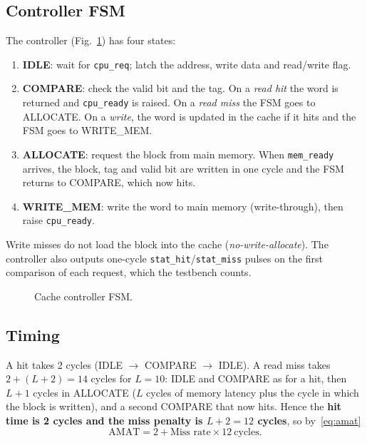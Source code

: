\documentclass[conference]{IEEEtran}
\begin{document}
\subsection{Controller FSM}
The controller (Fig.~\ref{fig:fsm}) has four states:
\begin{enumerate}
\item \textbf{IDLE}: wait for \texttt{cpu\_req}; latch the address, write data and read/write flag.
\item \textbf{COMPARE}: check the valid bit and the tag. On a \emph{read hit} the word is returned and
\texttt{cpu\_ready} is raised. On a \emph{read miss} the FSM goes to ALLOCATE. On a \emph{write}, the word is
updated in the cache if it hits and the FSM goes to WRITE\_MEM.
\item \textbf{ALLOCATE}: request the block from main memory. When \texttt{mem\_ready} arrives, the block, tag and
valid bit are written in one cycle and the FSM returns to COMPARE, which now hits.
\item \textbf{WRITE\_MEM}: write the word to main memory (write-through), then raise \texttt{cpu\_ready}.
\end{enumerate}
Write misses do not load the block into the cache (\emph{no-write-allocate}). The controller also outputs one-cycle
\texttt{stat\_hit}/\texttt{stat\_miss} pulses on the first comparison of each request, which the testbench counts.

\begin{figure}[t]
\centering
\resizebox{0.95\columnwidth}{!}{}
\caption{Cache controller FSM.}
\label{fig:fsm}
\end{figure}

\subsection{Timing}
A hit takes 2 cycles (IDLE $\rightarrow$ COMPARE $\rightarrow$ IDLE). A read miss takes
$2 + (L + 2) = 14$ cycles for $L = 10$: IDLE and COMPARE as for a hit, then $L + 1$ cycles in ALLOCATE ($L$ cycles
of memory latency plus the cycle in which the block is written), and a second COMPARE that now hits. Hence the \textbf{hit time is 2 cycles and the miss penalty is
$L + 2 = 12$ cycles}, so by~\eqref{eq:amat}
\begin{equation}
\text{AMAT} = 2 + \text{Miss rate} \times 12 \ \text{cycles}.
\end{equation}
\end{document}
